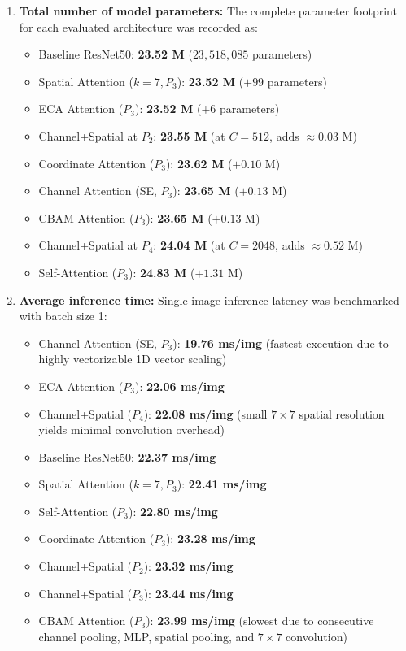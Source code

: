 \documentclass[10pt]{article}
\begin{document}
\begin{enumerate}
\item \textbf{Total number of model parameters:}
The complete parameter footprint for each evaluated architecture was recorded as:
\begin{itemize}
\item Baseline ResNet50: \textbf{23.52 M} ($23,518,085$ parameters)
\item Spatial Attention ($k=7, P_3$): \textbf{23.52 M} ($+99$ parameters)
\item ECA Attention ($P_3$): \textbf{23.52 M} ($+6$ parameters)
\item Channel+Spatial at $P_2$: \textbf{23.55 M} (at $C=512$, adds $\approx 0.03\text{ M}$)
\item Coordinate Attention ($P_3$): \textbf{23.62 M} ($+0.10\text{ M}$)
\item Channel Attention (SE, $P_3$): \textbf{23.65 M} ($+0.13\text{ M}$)
\item CBAM Attention ($P_3$): \textbf{23.65 M} ($+0.13\text{ M}$)
\item Channel+Spatial at $P_4$: \textbf{24.04 M} (at $C=2048$, adds $\approx 0.52\text{ M}$)
\item Self-Attention ($P_3$): \textbf{24.83 M} ($+1.31\text{ M}$)
\end{itemize}

\item \textbf{Average inference time:}
Single-image inference latency was benchmarked with batch size 1:
\begin{itemize}
\item Channel Attention (SE, $P_3$): \textbf{19.76 ms/img} (fastest execution due to highly vectorizable 1D vector scaling)
\item ECA Attention ($P_3$): \textbf{22.06 ms/img}
\item Channel+Spatial ($P_4$): \textbf{22.08 ms/img} (small $7\times7$ spatial resolution yields minimal convolution overhead)
\item Baseline ResNet50: \textbf{22.37 ms/img}
\item Spatial Attention ($k=7, P_3$): \textbf{22.41 ms/img}
\item Self-Attention ($P_3$): \textbf{22.80 ms/img}
\item Coordinate Attention ($P_3$): \textbf{23.28 ms/img}
\item Channel+Spatial ($P_2$): \textbf{23.32 ms/img}
\item Channel+Spatial ($P_3$): \textbf{23.44 ms/img}
\item CBAM Attention ($P_3$): \textbf{23.99 ms/img} (slowest due to consecutive channel pooling, MLP, spatial pooling, and $7\times7$ convolution)
\end{itemize}


\end{enumerate}
\end{document}

